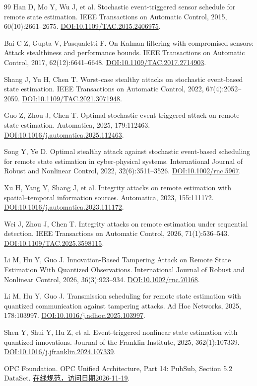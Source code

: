 \begin{thebibliography}{99}
Han D, Mo Y, Wu J, et al. Stochastic event-triggered sensor schedule for remote state estimation.
IEEE Transactions on Automatic Control, 2015, 60(10):2661--2675.
\href{https://doi.org/10.1109/TAC.2015.2406975}{DOI:10.1109/TAC.2015.2406975}.

Bai C Z, Gupta V, Pasqualetti F. On Kalman filtering with compromised sensors: Attack stealthiness and performance bounds.
IEEE Transactions on Automatic Control, 2017, 62(12):6641--6648.
\href{https://doi.org/10.1109/TAC.2017.2714903}{DOI:10.1109/TAC.2017.2714903}.

Shang J, Yu H, Chen T. Worst-case stealthy attacks on stochastic event-based state estimation.
IEEE Transactions on Automatic Control, 2022, 67(4):2052--2059.
\href{https://doi.org/10.1109/TAC.2021.3071948}{DOI:10.1109/TAC.2021.3071948}.

Guo Z, Zhou J, Chen T. Optimal stochastic event-triggered attack on remote state estimation.
Automatica, 2025, 179:112463.
\href{https://doi.org/10.1016/j.automatica.2025.112463}{DOI:10.1016/j.automatica.2025.112463}.

Song Y, Ye D. Optimal stealthy attack against stochastic event-based scheduling for remote state estimation in cyber-physical systems.
International Journal of Robust and Nonlinear Control, 2022, 32(6):3511--3526.
\href{https://doi.org/10.1002/rnc.5967}{DOI:10.1002/rnc.5967}.

Xu H, Yang Y, Shang J, et al. Integrity attacks on remote estimation with spatial--temporal information sources.
Automatica, 2023, 155:111172.
\href{https://doi.org/10.1016/j.automatica.2023.111172}{DOI:10.1016/j.automatica.2023.111172}.

Wei J, Zhou J, Chen T. Integrity attacks on remote estimation under sequential detection.
IEEE Transactions on Automatic Control, 2026, 71(1):536--543.
\href{https://doi.org/10.1109/TAC.2025.3598115}{DOI:10.1109/TAC.2025.3598115}.

Li M, Hu Y, Guo J. Innovation-Based Tampering Attack on Remote State Estimation With Quantized Observations.
International Journal of Robust and Nonlinear Control, 2026, 36(3):923--934.
\href{https://doi.org/10.1002/rnc.70168}{DOI:10.1002/rnc.70168}.

Li M, Hu Y, Guo J. Transmission scheduling for remote state estimation with quantized communication against tampering attacks.
Ad Hoc Networks, 2025, 178:103997.
\href{https://doi.org/10.1016/j.adhoc.2025.103997}{DOI:10.1016/j.adhoc.2025.103997}.

Shen Y, Shui Y, Hu Z, et al. Event-triggered nonlinear state estimation with quantized innovations.
Journal of the Franklin Institute, 2025, 362(1):107339.
\href{https://doi.org/10.1016/j.jfranklin.2024.107339}{DOI:10.1016/j.jfranklin.2024.107339}.

OPC Foundation. OPC Unified Architecture, Part 14: PubSub, Section 5.2 DataSet.
\href{https://reference.opcfoundation.org/Core/Part14/v105/docs/5.2}{在线规范，访问日期2026-11-19}.
\end{thebibliography}
